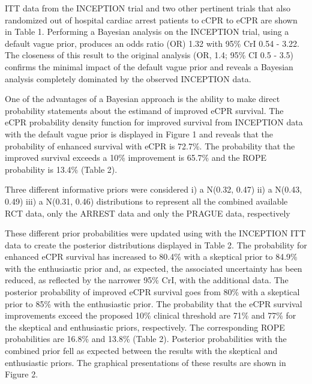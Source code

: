 \documentclass[
  super,
  preprint,
  3p]{elsarticle}
\begin{document}
ITT data from the INCEPTION trial\citep{CPR2023a} and two other
pertinent trials\citep{RN6759, RN6751} that also randomized out of
hospital cardiac arrest patients to cCPR to eCPR are shown in Table 1.
Performing a Bayesian analysis on the INCEPTION trial, using a default
vague prior, produces an odds ratio (OR) 1.32 with 95\% CrI 0.54 - 3.22.
The closeness of this result to the original analysis (OR, 1.4; 95\% CI
0.5 - 3.5) confirms the minimal impact of the default vague prior and
reveals a Bayesian analysis completely dominated by the observed
INCEPTION data.

One of the advantages of a Bayesian approach is the ability to make
direct probability statements about the estimand of improved eCPR
survival. The eCPR probability density function for improved survival
from INCEPTION data with the default vague prior is displayed in Figure
1 and reveals that the probability of enhanced survival with eCPR is
72.7\%. The probability that the improved survival exceeds a 10\%
improvement is 65.7\% and the ROPE probability is 13.4\% (Table 2).

Three different informative priors were considered i) a N(0.32, 0.47)
ii) a N(0.43, 0.49) iii) a N(0.31, 0.46) distributions to represent all
the combined available RCT data\citep{RN6759, RN6751}, only the
ARREST\citep{RN6751} data and only the PRAGUE\citep{RN6759} data,
respectively

These different prior probabilities were updated using with the
INCEPTION ITT data to create the posterior distributions displayed in
Table 2. The probability for enhanced eCPR survival has increased to
80.4\% with a skeptical prior to 84.9\% with the enthusiastic prior and,
as expected, the associated uncertainty has been reduced, as reflected
by the narrower 95\% CrI, with the additional data. The posterior
probability of improved eCPR survival goes from 80\% with a skeptical
prior to 85\% with the enthusiastic prior. The probability that the eCPR
survival improvements exceed the proposed 10\% clinical threshold are
71\% and 77\% for the skeptical and enthusiastic priors, respectively.
The corresponding ROPE probabilities are 16.8\% and 13.8\% (Table 2).
Posterior probabilities with the combined prior fell as expected between
the results with the skeptical and enthusiastic priors. The graphical
presentations of these results are shown in Figure 2.
\end{document}
